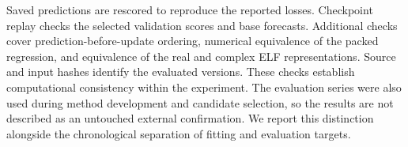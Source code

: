 Saved predictions are rescored to reproduce the reported losses. Checkpoint replay checks the selected validation scores and base forecasts. Additional checks cover prediction-before-update ordering, numerical equivalence of the packed regression, and equivalence of the real and complex ELF representations. Source and input hashes identify the evaluated versions. These checks establish computational consistency within the experiment. The evaluation series were also used during method development and candidate selection, so the results are not described as an untouched external confirmation. We report this distinction alongside the chronological separation of fitting and evaluation targets.

